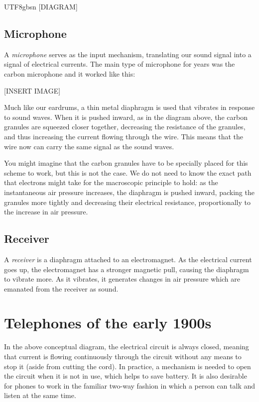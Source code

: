 \documentclass[UTF8]{book}
\begin{document}
\begin{CJK}{UTF8}{gbsn}
[DIAGRAM]

\subsection{Microphone}

A \emph{microphone} serves as the input mechanism, translating our sound signal into a signal of electrical currents. The main type of microphone for years was the carbon microphone and it worked like this:

[INSERT IMAGE]

Much like our eardrums, a thin metal diaphragm is used that vibrates in response to sound waves. When it is pushed inward, as in the diagram above, the carbon granules are squeezed closer together, decreasing the resistance of the granules, and thus increasing the current flowing through the wire. This means that the wire now can carry the same signal as the sound waves.

You might imagine that the carbon granules have to be specially placed for this scheme to work, but this is not the case. We do not need to know the exact path that electrons might take for the macroscopic principle to hold: as the instantaneous air pressure increases, the diaphragm is pushed inward, packing the granules more tightly and decreasing their electrical resistance, proportionally to the increase in air pressure.

\subsection{Receiver}

A \emph{receiver} is a diaphragm attached to an electromagnet. As the electrical current goes up, the electromagnet has a stronger magnetic pull, causing the diaphragm to vibrate more. As it vibrates, it generates changes in air pressure which are emanated from the receiver as sound.

\section{Telephones of the early 1900s}

In the above conceptual diagram, the electrical circuit is always closed, meaning that current is flowing continuously through the circuit without any means to stop it (aside from cutting the cord). In practice, a mechanism is needed to open the circuit when it is not in use, which helps to save battery. It is also desirable for phones to work in the familiar two-way fashion in which a person can talk and listen at the same time.



\end{CJK}
\end{document}
